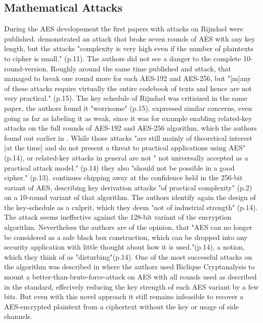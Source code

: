 \subsection{Mathematical Attacks}
\label{ch:mathematicalattacks}

During the AES developement the first papers with attacks on Rijndael were published. \cite{Gilbert00acollision} demonstrated an attack that broke seven rounds of AES with any key length, but the attacks "complexity is very high even if the number of plaintexts to cipher is small." (p.11). The authors did not see a danger to the complete 10-round-version.
Roughly around the same time \cite{impcryptan} published and attack, that managed to break one round more for each AES-192 and AES-256, but "[m]any of these attacks require virtually the entire codebook of texts and hence are not very practical." (p.15).
The key schedule of Rijndael was critisized in the same paper, the authors found it "worrisome" (p.15). \cite{rkeyattack} expressed similar concerns, even going as far as labeling it as weak, since it was for example enabling related-key attacks on the full rounds of AES-192 and AES-256 algorithm, which the authors found out earlier in \cite{rkeyattack2}.  While those attacks "are still mainly of theoretical interest [at the time] and do not present a threat to practical applications using AES" (p.14), or related-key attacks in general are not " not universally accepted as a practical attack model."\cite{rkeyattack3} (p.14) they also "should not be possible in a good cipher." \cite{rkeyattack} (p.13). 
\cite{rkeyattack3} continues chipping away at the confidence held in the 256-bit variant of AES, describing key derivation attacks "of practical complexity" (p.2) on a 10-round variant of that algorithm. The authors identify again the design of the key-schedule as a culprit, which they deem "not of industrial strength" (p.14). The attack seems ineffective against the 128-bit variant of the encryption algorithm. Nevertheless the authors are of the opinion, that "AES can no longer be considered as a safe black box construction, which can be dropped into any security application with little thought about how it is used."(p.14), a notion, which they think of as "disturbing"(p.14).
One of the most successful attacks on the algorithm was described in \cite{biclique} where the authors used Biclique Cryptanalysis to mount a better-than-brute-force-attack on AES with all rounds used as described in the standard, effecively reducing the key strength of each AES variant by a few bits. But even with this novel approach it still remains infeasible to recover a AES-encrypted plaintext from a ciphertext without the key or usage of side channels.
